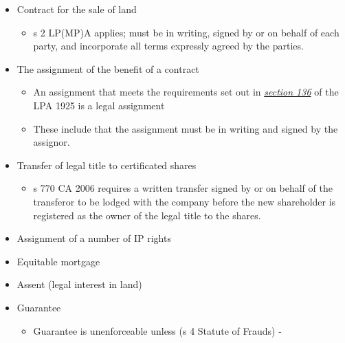 \documentclass[
]{article}
\providecommand{\tightlist}{%
  \setlength{\itemsep}{0pt}\setlength{\parskip}{0pt}}
\begin{document}
\begin{itemize}
\tightlist
\item
  Contract for the sale of land

  \begin{itemize}
  \tightlist
  \item
    s 2 LP(MP)A applies; must be in writing, signed by or on behalf of
    each party, and incorporate all terms expressly agreed by the
    parties.
  \end{itemize}
\item
  The assignment of the benefit of a contract

  \begin{itemize}
  \tightlist
  \item
    An assignment that meets the requirements set out in
    \emph{\href{https://uk.practicallaw.thomsonreuters.com/2-505-5703?originationContext=document\&transitionType=PLDocumentLink\&contextData=(sc.Default)\&ppcid=0e69ecc7bd0b425c8c07be4517611bac}{section
    136}} of the LPA 1925 is a legal assignment
  \item
    These include that the assignment must be in writing and signed by
    the assignor.\\
  \end{itemize}
\item
  Transfer of legal title to certificated shares

  \begin{itemize}
  \tightlist
  \item
    s 770 CA 2006 requires a written transfer signed by or on behalf of
    the transferor to be lodged with the company before the new
    shareholder is registered as the owner of the legal title to the
    shares.
  \end{itemize}
\item
  Assignment of a number of IP rights
\item
  Equitable mortgage
\item
  Assent (legal interest in land)
\item
  Guarantee

  \begin{itemize}
  \tightlist
  \item
    Guarantee is unenforceable unless (s 4 Statute of Frauds) -


\end{itemize}
\end{itemize}
\end{document}
